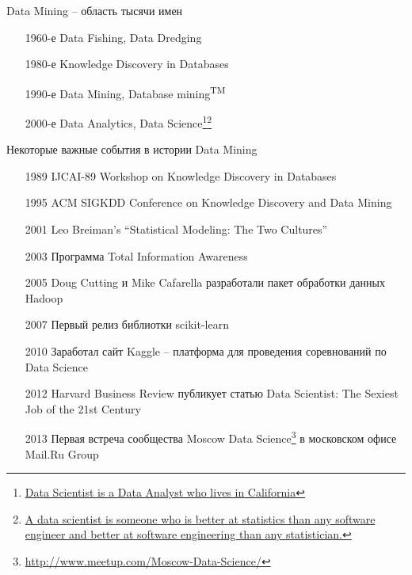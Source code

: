 \documentclass[aspectratio=169]{beamer}
\begin{document}
\begin{frame}{Data Mining -- область тысячи имен}

\begin{enumerate}
\item[1960-е] Data Fishing, Data Dredging
\item[1980-е] Knowledge Discovery in Databases
\item[1990-е] Data Mining, Database mining\textsuperscript{TM}
\item[2000-е] Data Analytics, Data Science\footnote{\href{https://twitter.com/nivertech/status/180109930139893761}{Data Scientist is a Data Analyst who lives in California}}\footnote{\href{https://twitter.com/josh_wills/status/198093512149958656}{A data scientist is someone who is better at statistics than any software engineer and better at software engineering than any statistician.}\vspace{1.5em}}
\end{enumerate}

\end{frame}

\begin{frame}{Некоторые важные события в истории Data Mining}

\begin{enumerate}
\item[1989] IJCAI-89 Workshop on Knowledge Discovery in Databases 
\item[1995] ACM SIGKDD Conference on Knowledge Discovery and Data Mining
\item[2001] Leo Breiman's ``Statistical Modeling: The Two Cultures''
\item[2003] Программа Total Information Awareness
\item[2005] Doug Cutting и Mike Cafarella разработали пакет обработки данных Hadoop
\item[2007] Первый релиз библиотки scikit-learn
\item[2010] Заработал сайт Kaggle -- платформа для проведения соревнований по Data Science
\item[2012] Harvard Business Review публикует статью Data Scientist: The Sexiest Job of the 21st Century
\item[2013] Первая встреча сообщества Moscow Data Science\footnote{\url{http://www.meetup.com/Moscow-Data-Science/}\vspace{1.5em}} в московском офисе Mail.Ru Group
\end{enumerate}

\end{frame}
\end{document}
